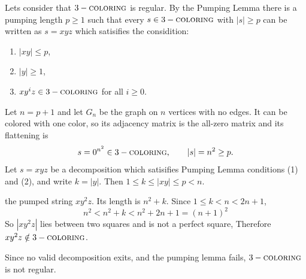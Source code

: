 \documentclass[a4paper]{exam}
\newcommand{\prob}{3-\textsc{coloring}} %
\begin{document}
\begin{questions}
\begin{solution}
		Lets consider that $\prob$ is regular. By the Pumping Lemma there is a pumping length $p \ge 1$ such that every $s \in \prob$ with $|s| \ge p$ can be written as $s = xyz$ which satisifies the considition:
		\begin{enumerate}
			\item $|xy| \le p$,
			\item $|y| \ge 1$,
			\item $xy^iz \in \prob$ for all $i \ge 0$.
		\end{enumerate}

		Let $n = p+1$ and let $G_n$ be the graph on $n$ vertices with no edges. It can be colored with one color, so its adjacency matrix is the all-zero matrix and its flattening is
		$$s = 0^{n^2} \in \prob, \qquad |s| = n^2 \ge p.$$
		Let $s = xyz$ be a decomposition which satisifies Pumping Lemma conditions (1) and (2), and write $k = |y|$. Then $1 \le k \le |xy| \le p < n$.

		the pumped string $xy^2z$. Its length is $n^2 + k$. Since $1 \le k < n < 2n+1$,
		$$n^2 < n^2 + k < n^2 + 2n + 1 = (n+1)^2$$
		So $|xy^2z|$ lies between two squares and is not a perfect square, Therefore $xy^2z \notin \prob$.

		Since no valid decomposition exits, and the pumping lemma fails, $\prob$ is not regular.

	\end{solution}


\end{questions}
\end{document}
